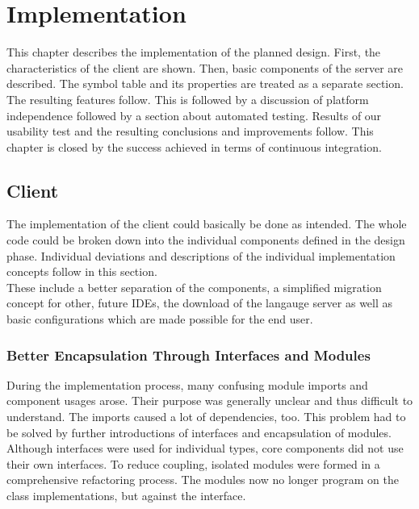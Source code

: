 \section{Implementation}
\label{chapter:implementation}
This chapter describes the implementation of the planned design.
First, the characteristics of the client are shown.
Then, basic components of the server are described.
The symbol table and its properties are treated as a separate section.
The resulting features follow.
This is followed by a discussion of platform independence followed by a section about automated testing.
Results of our usability test and the resulting conclusions and improvements follow.
This chapter is closed by the success achieved in terms of continuous integration.

\subsection{Client}
The implementation of the client could basically be done as intended.
The whole code could be broken down into the individual components defined in the design phase.
Individual deviations and descriptions of the individual implementation concepts follow in this section. \\

These include a better separation of the components,
a simplified migration concept for other, future IDEs,
the download of the langauge server
as well as basic configurations which are made possible for the end user.

\subsubsection{Better Encapsulation Through Interfaces and Modules}
\label{section:implementation:client:module_encapsulation}

During the implementation process, many confusing module imports and component usages arose.
Their purpose was generally unclear and thus difficult to understand.
The imports caused a lot of dependencies, too.
This problem had to be solved by further introductions of interfaces and encapsulation of modules. \\

Although interfaces were used for individual types,
core components did not use their own interfaces.
To reduce coupling, isolated modules were formed in a comprehensive refactoring process.
The modules now no longer program on the class implementations, but against the interface. \\

